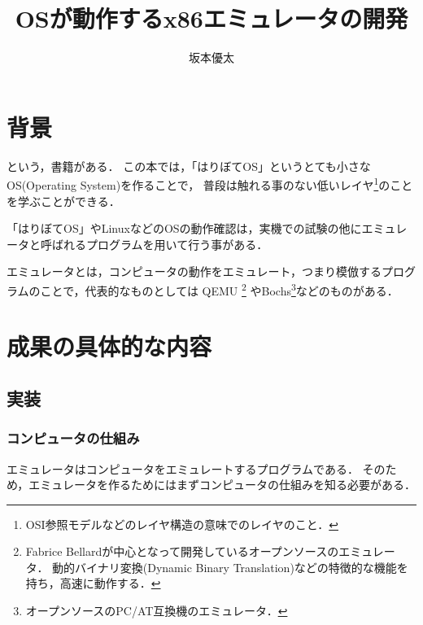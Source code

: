 \documentclass[10pt,a4j]{jsarticle}
\title{\vspace{-4cm}OSが動作するx86エミュレータの開発}
\author{坂本優太}
\date{}
\begin{document}
\maketitle


\section{背景}
\cite[30日でできる！ OS自作入門]{30days-osdev}という，書籍がある．
この本では，「はりぼてOS」というとても小さなOS(Operating System)を作ることで，
普段は触れる事のない低いレイヤ\footnote{OSI参照モデルなどのレイヤ構造の意味でのレイヤのこと．}のことを学ぶことができる．

「はりぼてOS」やLinuxなどのOSの動作確認は，実機での試験の他にエミュレータと呼ばれるプログラムを用いて行う事がある．

エミュレータとは，コンピュータの動作をエミュレート，つまり模倣するプログラムのことで，代表的なものとしては
QEMU
\footnote{Fabrice Bellardが中心となって開発しているオープンソースのエミュレータ．
動的バイナリ変換(Dynamic Binary Translation)などの特徴的な機能を持ち，高速に動作する．}
やBochs\footnote{オープンソースのPC/AT互換機のエミュレータ．}などのものがある．


\section{成果の具体的な内容}

\subsection{実装}
\subsubsection{コンピュータの仕組み}
エミュレータはコンピュータをエミュレートするプログラムである．
そのため，エミュレータを作るためにはまずコンピュータの仕組みを知る必要がある．
\end{document}
